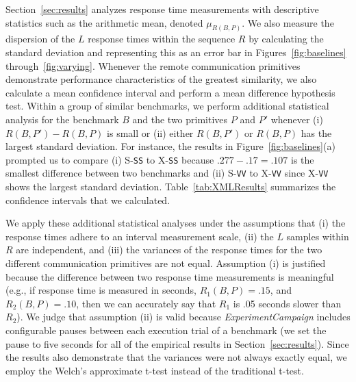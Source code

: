 \documentclass{sig-alternate}
\begin{document}


Section~\ref{sec:results} analyzes response time measurements with
descriptive statistics such as the arithmetic mean, denoted
$\mu_{R(B,P)}$.  We also measure the dispersion of the $L$ response
times within the sequence $R$ by calculating the standard deviation
and representing this as an error bar in Figures~\ref{fig:baselines}
through~\ref{fig:varying}.  Whenever the remote communication
primitives demonstrate performance characteristics of the greatest
similarity, we also calculate a mean confidence interval and perform a
mean difference hypothesis test.  Within a group of similar
benchmarks, we perform additional statistical analysis for the
benchmark $B$ and the two primitives $P$ and $P'$ whenever (i)
$R(B,P') - R(B,P)$ is small or (ii) either $R(B,P')$ or $R(B,P)$ has
the largest standard deviation.  For instance, the results in
Figure~\ref{fig:baselines}(a) prompted us to compare (i) S-{\tt SS} to
X-{\tt SS} because $.277-.17=.107$ is the smallest difference between
two benchmarks and (ii) S-{\tt VV} to X-{\tt VV} since X-{\tt VV}
shows the largest standard deviation.  Table~\ref{tab:XMLResults}
summarizes the confidence intervals that we calculated.

We apply these additional statistical analyses under the assumptions
that (i) the response times adhere to an interval measurement scale,
(ii) the $L$ samples within $R$ are independent, and (iii) the
variances of the response times for the two different communication
primitives are not equal.  Assumption (i) is justified because the
difference between two response time measurements is meaningful (e.g.,
if response time is measured in seconds, $R_1(B,P) = .15$, and
$R_2(B,P) = .10$, then we can accurately say that $R_1$ is .05 seconds
slower than $R_2$).  We judge that assumption (ii) is valid because
{\em ExperimentCampaign} includes configurable pauses between each
execution trial of a benchmark (we set the pause to five seconds for
all of the empirical results in Section~\ref{sec:results}).  Since the
results also demonstrate that the variances were not always exactly
equal, we employ the Welch's approximate t-test instead of the
traditional t-test.
\end{document}
